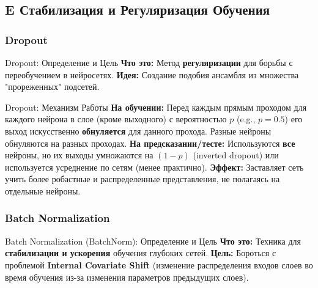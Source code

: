 \subsection{E Стабилизация и Регуляризация Обучения}

\subsubsection{Dropout}
\begin{myexampleblock}{Dropout: Определение и Цель}
    \textbf{Что это:} Метод \textbf{регуляризации} для борьбы с переобучением в нейросетях.
    \textbf{Идея:} Создание подобия ансамбля из множества "прореженных" подсетей.
\end{myexampleblock}

\begin{myexampleblock}{Dropout: Механизм Работы}
    \textbf{На обучении:} Перед каждым прямым проходом для каждого нейрона в слое (кроме выходного) с вероятностью $p$ (e.g., $p=0.5$) его выход искусственно \textbf{обнуляется} для данного прохода. Разные нейроны обнуляются на разных проходах.
    \textbf{На предсказании/тесте:} Используются \textbf{все} нейроны, но их выходы умножаются на $(1-p)$ (inverted dropout) или используется усреднение по сетям (менее практично).
    \textbf{Эффект:} Заставляет сеть учить более робастные и распределенные представления, не полагаясь на отдельные нейроны.
\end{myexampleblock}

\subsubsection{Batch Normalization}
\begin{myexampleblock}{Batch Normalization (BatchNorm): Определение и Цель}
    \textbf{Что это:} Техника для \textbf{стабилизации и ускорения} обучения глубоких сетей.
    \textbf{Цель:} Бороться с проблемой \textbf{Internal Covariate Shift} (изменение распределения входов слоев во время обучения из-за изменения параметров предыдущих слоев).
\end{myexampleblock}

